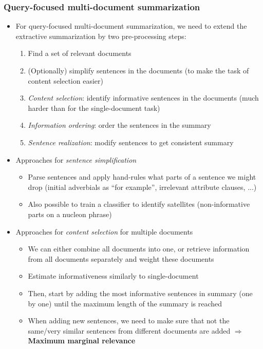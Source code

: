 \subsubsection{Query-focused multi-document summarization}
\begin{itemize}
	\item For query-focused multi-document summarization, we need to extend the extractive summarization by two pre-processing steps:
	\begin{enumerate}
		\item Find a set of relevant documents
		\item (Optionally) simplify sentences in the documents (to make the task of content selection easier)
		\item \textit{Content selection}: identify informative sentences in the documents (much harder than for the single-document task)
		\item \textit{Information ordering}: order the sentences in the summary
		\item \textit{Sentence realization}: modify sentences to get consistent summary
	\end{enumerate}
	\item Approaches for \textit{sentence simplification}
	\begin{itemize}
		\item Parse sentences and apply hand-rules what parts of a sentence we might drop (initial adverbials as ``for example'', irrelevant attribute clauses, ...)
		\item Also possible to train a classifier to identify satellites (non-informative parts on a nucleon phrase)
	\end{itemize}
	\item Approaches for \textit{content selection} for multiple documents
	\begin{itemize}
		\item We can either combine all documents into one, or retrieve information from all documents separately and weight these documents
		\item Estimate informativeness similarly to single-document
		\item Then, start by adding the most informative sentences in summary (one by one) until the maximum length of the summary is reached
		\item When adding new sentences, we need to make sure that not the same/very similar sentences from different documents are added $\Rightarrow$ \textbf{Maximum marginal relevance}
		\begin{itemize}

\end{itemize}
\end{itemize}
\end{itemize}
